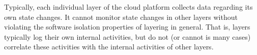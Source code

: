 
Typically, each individual layer of the cloud platform collects data regarding
its own
state changes. It cannot monitor state changes
in other layers without violating the software isolation properties of
layering in general.   That is, layers typically log their own internal
activities, but do not (or cannot is many cases) correlate these activities
with the internal activities of other layers.


